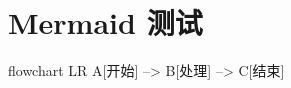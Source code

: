 \documentclass{ctexart}
\begin{document}
\section{Mermaid 测试}
\begin{mermaid}
flowchart LR
  A[开始] --> B[处理] --> C[结束]
\end{mermaid}
\end{document}
